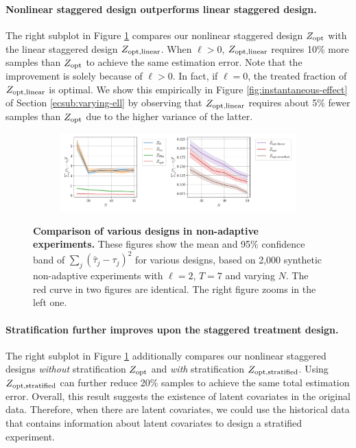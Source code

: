 \paragraph{Nonlinear staggered design outperforms linear staggered design.} The right subplot in Figure \ref{fig:varying-N-flu} compares our nonlinear staggered design $Z_{\textnormal{opt}}$ with the linear staggered design $Z_{\textnormal{opt},\mathrm{linear}}$. When $\ell > 0$, $Z_{\textnormal{opt},\mathrm{linear}}$ requires 10\% more samples than $Z_{\textnormal{opt}}$ to achieve the same estimation error. Note that the improvement is solely because of $\ell > 0$. In fact, if $\ell = 0$, the treated fraction of $Z_{\textnormal{opt},\mathrm{linear}}$ is optimal. We show this empirically in Figure \ref{fig:instantaneous-effect} of Section \ref{ecsub:varying-ell} by observing that $Z_{\textnormal{opt},\mathrm{linear}}$ requires about 5\% fewer samples than $Z_{\textnormal{opt}}$ due to the higher variance of the latter.

\begin{figure}[t!]
	\centering
	\begin{subfigure}{1\textwidth}
		\centering
		\includegraphics[width=1\linewidth]{plots/empirical/flu/nonadaptive/flu_T_7_varying_N_lag_2_agg.pdf}
	\end{subfigure}
	\caption{\textbf{Comparison of various designs in non-adaptive experiments.} These figures show the mean and 95\% confidence band of $\sum_{j}(\hat{\tau}_j - \tau_j)^2$ for various designs, based on 2,000 synthetic non-adaptive experiments with $\ell = 2$, $T = 7$ and varying $N$. The red curve in two figures are identical. The right figure zooms in the left one.
	}
	\label{fig:varying-N-flu}
\end{figure}

\paragraph{Stratification further improves upon the staggered treatment design.} The right subplot in Figure \ref{fig:varying-N-flu} additionally compares our nonlinear staggered designs \textit{without} stratification $Z_{\textnormal{opt}}$ and \textit{with} stratification $Z_{\textnormal{opt},\mathrm{stratified}}$. 
Using $Z_{\textnormal{opt},\mathrm{stratified}}$ can further reduce 20\% samples to achieve the same total estimation error. 
Overall, this result suggests the existence of latent covariates in the original data. Therefore, when there are latent covariates, we could use the historical data that contains information about latent covariates to design a stratified experiment.  

